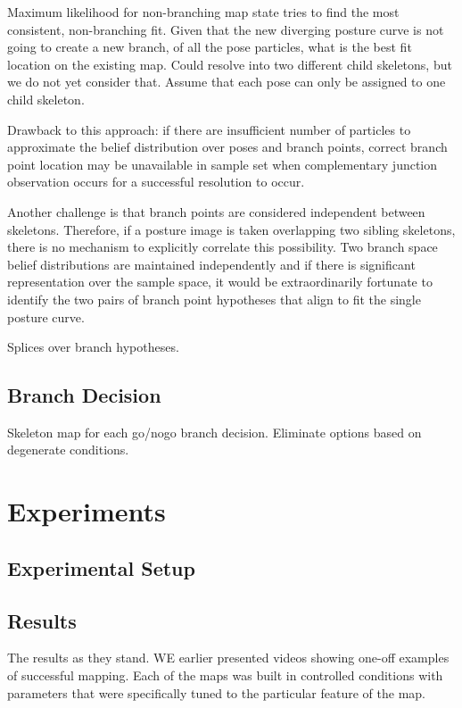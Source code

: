 Maximum likelihood for non-branching map state tries to find the most consistent, non-branching fit. Given that the new diverging posture curve is not going to create a new branch, of all the pose particles, what is the best fit location on the existing map. Could resolve into two different child skeletons, but we do not yet consider that. Assume that each pose can only be assigned to one child skeleton.

Drawback to this approach: if there are insufficient number of particles to approximate the belief distribution over poses and branch points, correct branch point location may be unavailable in sample set when complementary junction observation occurs for a successful resolution to occur. 

Another challenge is that branch points are considered independent between skeletons. Therefore, if a posture image is taken overlapping two sibling skeletons, there is no mechanism to explicitly correlate this possibility. Two branch space belief distributions are maintained independently and if there is significant representation over the sample space, it would be extraordinarily fortunate to identify the two pairs of branch point hypotheses that align to fit the single posture curve.

Splices over branch hypotheses. 

\section{Branch Decision}
\label{branchdecision}

Skeleton map for each go\slash nogo branch decision. Eliminate options based on degenerate conditions.

\pagebreak 

\chapter{Experiments}
\label{experiments}

\section{Experimental Setup}
\label{experimentalsetup}

\section{Results}
\label{experiment:results}

The results as they stand. WE earlier presented videos showing one-off examples of successful mapping. Each of the maps was built in controlled conditions with parameters that were specifically tuned to the particular feature of the map.

